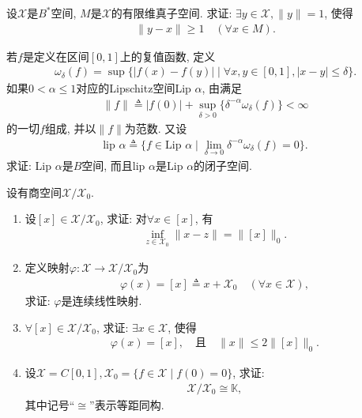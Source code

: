 \documentclass[../../main.tex]{subfiles}%
\begin{document}
\begin{example}
设$\mathscr{X}$是$B^*$空间, $M$是$\mathscr{X}$的有限维真子空间. 求证: $\exists y \in \mathscr{X}, \|y\| = 1$, 使得
\begin{align*}
\|y - x\| \geqslant 1 \quad (\forall x \in M).
\end{align*}
\end{example}

\begin{example}
若$f$是定义在区间$[0, 1]$上的复值函数, 定义
\begin{align*}
\omega_\delta(f) = \sup\{ |f(x) - f(y)| \mid \forall x, y \in [0, 1], |x - y| \leqslant \delta \}.
\end{align*}
如果$0 < \alpha \leqslant 1$对应的Lipschitz空间Lip $\alpha$, 由满足
\begin{align*}
\|f\| \triangleq |f(0)| + \sup_{\delta > 0} \{ \delta^{-\alpha} \omega_\delta(f) \} < \infty
\end{align*}
的一切$f$组成, 并以$\|f\|$为范数. 又设
\begin{align*}
\text{lip } \alpha \triangleq \{ f \in \text{Lip } \alpha \mid \lim_{\delta \to 0} \delta^{-\alpha} \omega_\delta(f) = 0 \}.
\end{align*}
求证: Lip $\alpha$是$B$空间, 而且lip $\alpha$是Lip $\alpha$的闭子空间.
\end{example}

\begin{example}
设有商空间$\mathscr{X}/\mathscr{X}_0$.
\begin{enumerate}[(1)]
\item 设$[x] \in \mathscr{X}/\mathscr{X}_0$, 求证: 对$\forall x \in [x]$, 有
\begin{align*}
\inf_{z \in \mathscr{X}_0} \|x - z\| = \|[x]\|_0.
\end{align*}
\item 定义映射$\varphi: \mathscr{X} \to \mathscr{X}/\mathscr{X}_0$为
\begin{align*}
\varphi(x) = [x] \triangleq x + \mathscr{X}_0 \quad (\forall x \in \mathscr{X}),
\end{align*}
求证: $\varphi$是连续线性映射.
\item $\forall [x] \in \mathscr{X}/\mathscr{X}_0$, 求证: $\exists x \in \mathscr{X}$, 使得
\begin{align*}
\varphi(x) = [x], \quad \text{且} \quad \|x\| \leqslant 2\|[x]\|_0.
\end{align*}
\item 设$\mathscr{X} = C[0, 1], \mathscr{X}_0 = \{ f \in \mathscr{X} \mid f(0) = 0 \}$, 求证:
\begin{align*}
\mathscr{X}/\mathscr{X}_0 \cong \mathbb{K},
\end{align*}
其中记号“$\cong$”表示等距同构.
\end{enumerate}
\end{example}
\end{document}
